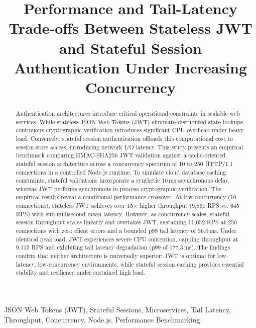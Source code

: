\documentclass[conference]{IEEEtran}
\begin{document}
\title{Performance and Tail-Latency Trade-offs Between Stateless JWT and Stateful Session Authentication Under Increasing Concurrency}

\author{
}

\maketitle

\begin{abstract}
Authentication architectures introduce critical operational constraints in scalable web services. While stateless JSON Web Tokens (JWT) eliminate distributed state lookups, continuous cryptographic verification introduces significant CPU overhead under heavy load. Conversely, stateful session authentication offloads this computational cost to session-store access, introducing network I/O latency. This study presents an empirical benchmark comparing HMAC-SHA256 JWT validation against a cache-oriented stateful session architecture across a concurrency spectrum of 10 to 250 HTTP/1.1 connections in a controlled Node.js runtime. To simulate cloud database caching constraints, stateful validations incorporate a synthetic 10\,ms asynchronous delay, whereas JWT performs synchronous in-process cryptographic verification. The empirical results reveal a conditional performance crossover. At low concurrency (10 connections), stateless JWT achieves over 15$\times$ higher throughput (9,861 RPS vs. 645 RPS) with sub-millisecond mean latency. However, as concurrency scales, stateful session throughput scales linearly and overtakes JWT, sustaining 11,052 RPS at 250 connections with zero client errors and a bounded p99 tail latency of 36.0\,ms. Under identical peak load, JWT experiences severe CPU contention, capping throughput at 9,115 RPS and exhibiting tail latency degradation (p99 of 177.3\,ms). The findings confirm that neither architecture is universally superior: JWT is optimal for low-latency, low-concurrency environments, while stateful session caching provides essential stability and resilience under sustained high load.
\end{abstract}

\begin{IEEEkeywords}
JSON Web Tokens (JWT), Stateful Sessions, Microservices, Tail Latency, Throughput, Concurrency, Node.js, Performance Benchmarking.
\end{IEEEkeywords}
\end{document}
